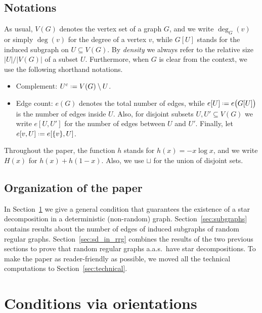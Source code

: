 \documentclass[12pt]{amsart}
\theoremstyle{definition}
\newcommand\comp{\mathrm{c}}
\newcommand\sm{\setminus}
\newcommand{\defeq}{\mathrel{\vcenter{\baselineskip0.5ex \lineskiplimit0pt
                     \hbox{\scriptsize.}\hbox{\scriptsize.}}}%
                     =}
\begin{document}
\subsection*{Notations}
%
As usual, $V(G)$ denotes the vertex set of a graph $G$, and we write $\deg_G(v)$ or simply $\deg(v)$ for the degree of a vertex $v$, while $G[U]$ stands for the induced subgraph on $U \subseteq V(G)$. By \emph{density} we always refer to the relative size $|U| \big/ |V(G)|$ of a subset $U$. Furthermore, when $G$ is clear from the context, we use the following shorthand notations.
%
\begin{itemize}
\item Complement: $U^\comp \defeq V(G) \sm U$.
\item Edge count: $e(G)$ denotes the total number of edges, while $e[U] \defeq e\big( G[U] \big)$ is the number of edges inside $U$. Also, for disjoint subsets $U,U' \subseteq V(G)$ we write $e[U,U']$ for the number of edges between $U$ and $U'$. Finally, let $e[v,U] \defeq e[\{v\},U]$.
\end{itemize}
%
Throughout the paper, the function $h$ stands for $h(x)=-x \log x$, and we write $H(x)$ for $h(x)+h(1-x)$. Also, we use $\sqcup$ for the union of disjoint sets.

\subsection*{Organization of the paper}
In Section~\ref{sec:conditions} we give a general condition that guarantees the existence of a star decomposition in a deterministic (non-random) graph. Section~\ref{sec:subgraphs} contains results about the number of edges of induced subgraphs of random regular graphs. Section~\ref{sec:sd_in_rrg} combines the results of the two previous sections to prove that random regular graphs a.a.s.~have star decompositions. To make the paper as reader-friendly as possible, we moved all the technical computations to Section~\ref{sec:technical}.

\section{Conditions via orientations} \label{sec:conditions}
\end{document}

